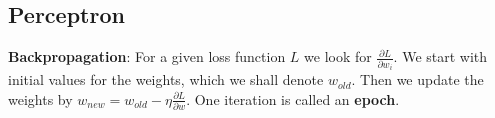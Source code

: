 \documentclass[aspectratio=169,10pt]{beamer}
\begin{document}
\subsection{Perceptron}
\begin{frame}{\secname}{\subsecname}
    \textbf{Backpropagation}: For a given loss function $L$ we look for $\frac{\partial L}{\partial w_i}$.
    We start with initial values for the weights, which we shall denote $w_{old}$.
    Then we update the weights by $w_{new} = w_{old} - \eta \frac{\partial L}{\partial w}$.
    One iteration is called an \textbf{epoch}.
\end{frame}

{\aauwavesbg
\begin{frame}
\end{frame}}
\end{document}
